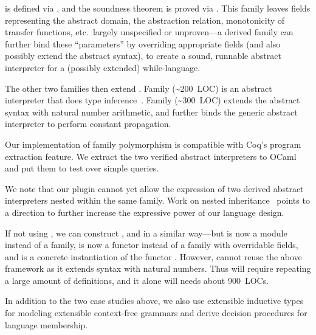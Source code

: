 \noindent
{} is defined via , and the soundness theorem
is proved via .
This family leaves fields representing the abstract domain, the
abstraction relation, monotonicity of transfer functions, etc.\ 
largely unspecified or unproven---a derived family can further bind
these ``parameters'' by overriding appropriate fields (and also possibly
extend the abstract syntax), to create a sound, runnable abstract
interpreter for a (possibly extended) while-language.

The other two families then extend .
Family  (\textasciitilde200~LOC) is an abstract
interpreter that does type inference~\cite{cousot1997types}.
Family  (\textasciitilde300~LOC) extends the abstract syntax
with natural number arithmetic,
and further binds the generic abstract interpreter to perform constant propagation.

Our implementation of family polymorphism is compatible with Coq's
program extraction feature.
We extract the two verified abstract interpreters to OCaml
and put them to test over simple queries. %

We note that our plugin cannot yet allow the expression of two derived abstract
interpreters nested within the same family.
Work on nested inheritance~\cite{ncm2004,zm2017} points to a direction
to further increase the expressive power of our language design.

If not using \Lang, we can construct ,  and  in a similar way---but  is now a module instead of a family,  is now a functor instead of a family with overridable fields, and  is a concrete instantiation of the functor . However,  cannot reuse the above framework as it extends syntax with natural numbers. Thus  will require repeating a large amount of definitions, and it alone will needs about 900~LOCs.

In addition to the two case studies above, we also use extensible
inductive types for modeling extensible context-free grammars and derive
decision procedures for language membership.

